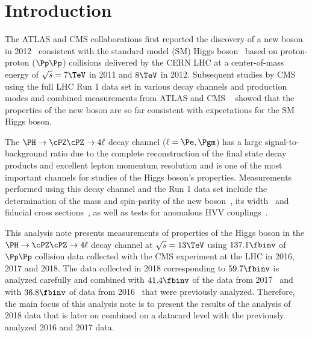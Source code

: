 \section{Introduction}
\label{sec:intro}

The ATLAS and CMS collaborations first reported the discovery of a new boson in 2012~\cite{Chatrchyan:2012ufa,Aad:2012tfa}
consistent with the standard model (SM) Higgs 
boson~\cite{Englert:1964et,Higgs:1964ia,Higgs:1964pj,Guralnik:1964eu,Higgs:1966ev,Kibble:1967sv} 
based on proton-proton ($\Pp\Pp$) collisions delivered by the CERN LHC at a center-of-mass energy of 
$\sqrt{s}=7\TeV$ in 2011 and $8\TeV$ in 2012. 
Subsequent studies by CMS using the full LHC Run 1 data set in various decay channels and production modes 
and combined measurements from ATLAS and CMS ~\cite{CMS:2014ega, AtlasProperties, Aad:2015zhl, CMS:2015kwa}
showed that the properties of the new boson are so far consistent with expectations for the SM Higgs boson.

The $\HZZfl$ decay channel ($\ell=\Pe,\Pgm$) has a large signal-to-background ratio due to the 
complete reconstruction of the final state decay products and excellent lepton momentum resolution
and is one of the most important channels for studies of the Higgs boson's properties. 
Measurements performed using this decay channel and the Run 1 data set include the determination of 
the mass and spin-parity of the new boson~\cite{CMSH4lLegacy,CMSH4lSpinParity,CMSH4lAnomalousCouplings}, 
its width~\cite{CMSH4lWidth,CMSH4lLifetime} and fiducial cross sections~\cite{CMSH4lFiducial8TeV}, as well as 
tests for anomalous HVV couplings~\cite{CMSH4lAnomalousCouplings,CMSH4lLifetime}. 

This analysis note presents measurements of properties of the Higgs boson in the $\HZZfl$ decay channel at $\sqrt{s}=13\TeV$
using $\usedLumiABC$ of $\Pp\Pp$ collision data collected with the CMS experiment at the LHC in 2016, 2017 and 2018.
The data collected in 2018 corresponding to $\usedLumiC$ is analyzed carefully and combined with $\usedLumiB$ of the data from 
2017~\cite{CMS-PAS-HIG-18-001} and with $\usedLumiA$ of data from 2016~\cite{CMS-HIG-16-041} that were previously analyzed. Therefore, the main
focus of this analysis note is to present the results of the analysis of 2018 data that is later on combined on a datacard level
with the previously analyzed 2016 and 2017 data.





